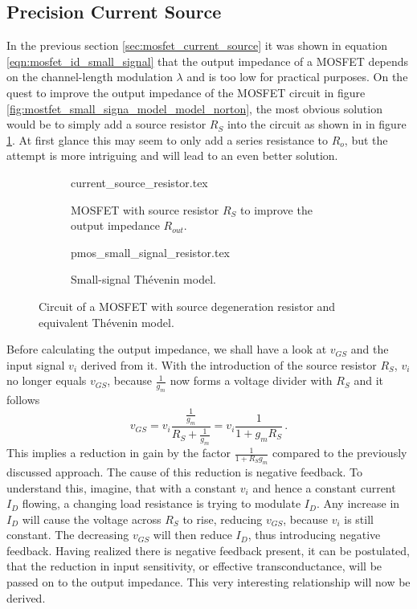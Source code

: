 \clearpage
\subsection{Precision Current Source}%
\label{sec:precision_current_source}
In the previous section \ref{sec:mosfet_current_source} it was shown in equation \ref{eqn:mosfet_id_small_signal} that the output impedance of a MOSFET depends on the channel-length modulation $\lambda$ and is too low for practical purposes. On the quest to improve the output impedance of the MOSFET circuit in figure \ref{fig:mostfet_small_signa_model_model_norton}, the most obvious solution would be to simply add a source resistor $R_S$ into the circuit as shown in in figure \ref{fig:pmos_current_source_resistor}. At first glance this may seem to only add a series resistance to $R_o$, but the attempt is more intriguing and will lead to an even better solution.

\begin{figure}[ht]
    \centering
    \begin{subfigure}[t]{0.45\linewidth}
        \centering
        {current_source_resistor.tex}
        \caption{MOSFET with source resistor $R_S$ to improve the output impedance $R_{out}$.}
        \label{fig:pmos_current_source_resistor}
    \end{subfigure}%
    \begin{subfigure}[t]{0.45\linewidth}
         \centering
         {pmos_small_signal_resistor.tex}
         \caption{Small-signal Thévenin model.}
         \label{fig:pmos_current_source_resistor_small_signal}
     \end{subfigure}%
     \caption{Circuit of a MOSFET with source degeneration resistor and equivalent Thévenin model.}
\end{figure}

Before calculating the output impedance, we shall have a look at $v_{GS}$ and the input signal $v_i$ derived from it. With the introduction of the source resistor $R_S$, $v_i$ no longer equals $v_{GS}$, because $\frac{1}{g_m}$ now forms a voltage divider with $R_S$ and it follows
\begin{equation}
    v_{GS} = v_i \frac{\frac{1}{g_m}}{R_S + \frac{1}{g_m}} = v_i \frac{1}{1 + g_m R_S} \,.
\end{equation}
This implies a reduction in gain by the factor $\frac{1}{1 + R_S g_m}$ compared to the previously discussed approach. The cause of this reduction is negative feedback. To understand this, imagine, that with a constant $v_i$ and hence a constant current $I_D$ flowing, a changing load resistance is trying to modulate $I_D$. Any increase in $I_D$ will cause the voltage across $R_S$ to rise, reducing $v_{GS}$, because $v_i$ is still constant. The decreasing $v_{GS}$ will then reduce $I_D$, thus introducing negative feedback. Having realized there is negative feedback present, it can be postulated, that the reduction in input sensitivity, or effective transconductance, will be passed on to the output impedance. This very interesting relationship will now be derived.


